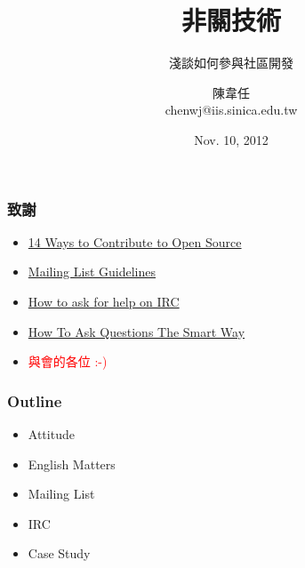 \documentclass[CJK]{beamer}
\begin{document}
\begin{CJK}{UTF8}{bkai}

\title{非關技術}
\subtitle{淺談如何參與社區開發}
\author{
  陳韋任 \\
  chenwj@iis.sinica.edu.tw
}
\date{Nov. 10, 2012}

\begin{frame}[plain]
  \titlepage
\end{frame}

\begin{frame}
  \frametitle{致謝}

\begin{itemize}
  \item \href{http://blog.smartbear.com/software-quality/bid/167051/14-Ways-to-Contribute-to-Open-Source-without-Being-a-Programming-Genius-or-a-Rock-Star}{14 Ways to Contribute to Open Source}
  \item \href{http://kernelnewbies.org/mailinglistguidelines}{Mailing List Guidelines}
  \item \href{http://jeff.jones.be/technology/articles/how-to-ask-for-help-on-irc/}{How to ask for help on IRC}
  \item \href{http://www.catb.org/~esr/faqs/smart-questions.html}{How To Ask Questions The Smart Way}
  \item \textcolor{red}{與會的各位 :-)}
\end{itemize}

\end{frame}

\begin{frame}
  \frametitle{Outline}

\begin{itemize}
  \item Attitude
  \item English Matters
  \item Mailing List
  \item IRC
  \item Case Study
\end{itemize}

\end{frame}


\end{CJK}
\end{document}
